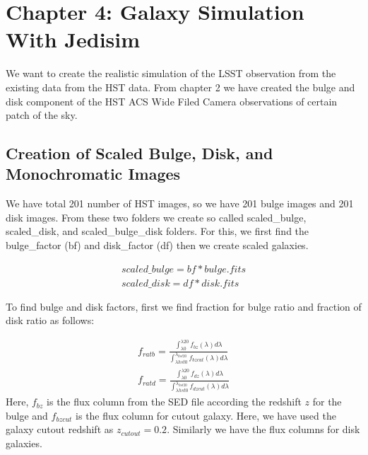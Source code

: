 %
%
%
%
\section{Chapter 4: Galaxy Simulation With Jedisim}\label{sec:chap4}
We want to create the realistic simulation of the LSST observation from the existing data from the
HST data. From chapter 2 we have created the bulge and disk component of the HST ACS Wide Filed Camera observations
of certain patch of the sky. 

\subsection{Creation of Scaled Bulge, Disk, and Monochromatic Images}
We have total 201 number of HST images, so we have 201 bulge images and 201 disk images.
From these two folders we create so called scaled\_bulge, scaled\_disk, and scaled\_bulge\_disk folders. For this,
we first find the bulge\_factor (bf) and disk\_factor (df) then we create scaled galaxies.

 \begin{eqnarray}
 scaled\_bulge = bf * bulge.fits \\
 scaled\_disk = df * disk.fits
 \end{eqnarray}
 
 

To find bulge and disk factors, first we find fraction for bulge ratio and fraction of disk ratio as follows:

 \begin{eqnarray}
 f_{ratb} = \frac{\int_{\lambda0}^{\lambda20} f_{bz}(\lambda)d\lambda}
 {\int_{\lambda{hst0}}^{\lambda_{hst20}} f_{bzcut}(\lambda)d\lambda} \\
 f_{ratd} = \frac{\int_{\lambda0}^{\lambda20} f_{dz}(\lambda)d\lambda}
 {\int_{\lambda{hst0}}^{\lambda_{hst20}} f_{dzcut}(\lambda)d\lambda}
 \end{eqnarray}
Here, $f_{bz}$ is the flux column from the SED file according the redshift $z$ for the bulge and $f_{bzcut}$ is the 
flux column for cutout galaxy. Here, we have used the galaxy cutout redshift as $ z_{cutout} = 0.2$. Similarly we have the flux columns for disk galaxies.

